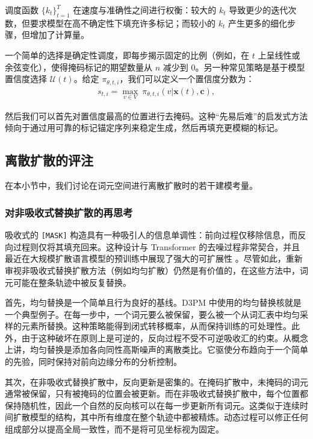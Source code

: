 \documentclass[UTF8,a4paper,zihao=-4,oneside,openany]{ctexbook}
\begin{document}
\noindent 调度函数 $\{k_t\}_{t=1}^T$ 在速度与准确性之间进行权衡：较大的 $k_t$ 导致更少的迭代次数，但要求模型在高不确定性下填充许多标记；而较小的 $k_t$ 产生更多的细化步骤，但增加了计算量。

一个简单的选择是确定性调度，即每步揭示固定的比例（例如，在 $t$ 上呈线性或余弦变化），使得掩码标记的期望数量从 $n$ 减少到 $0$。另一种常见策略是基于模型置信度选择 $\mathcal{U}(t)$。给定 $\pi_{\theta,t,i}$，我们可以定义一个置信度分数为：
\begin{eqnarray}
s_{t,i} = \max_{v\in V}\ \pi_{\theta,t,i}\!\left(v| \mathbf{x}(t),\mathbf{c}\right),
\end{eqnarray}

\noindent 然后我们可以首先对置信度最高的位置进行去掩码。这种“先易后难”的启发式方法倾向于通过用可靠的标记锚定序列来稳定生成，然后再填充更模糊的标记。
\subsection{离散扩散的评注}

在本小节中，我们讨论在词元空间进行离散扩散时的若干建模考量。

\subsubsection{对非吸收式替换扩散的再思考}
\label{sec:rethink-non-absorbing}

吸收式的 \texttt{[MASK]} 构造具有一种吸引人的信息单调性：前向过程仅移除信息，而反向过程则仅将其填充回来。这种设计与 Transformer 的去噪过程非常契合，并且最近在大规模扩散语言模型的预训练中展现了强大的可扩展性 \citep{sahoo-etal:2024simple,nie-etal:2025large}。尽管如此，重新审视非吸收式替换扩散方法（例如均匀扩散）仍然是有价值的，在这些方法中，词元可能在整条轨迹中被反复替换。

首先，均匀替换是一个简单且行为良好的基线。D3PM 中使用的均匀替换核就是一个典型例子。在每一步中，一个词元要么被保留，要么被一个从词汇表中均匀采样的元素所替换。这种策略能得到闭式转移概率，从而保持训练的可处理性。此外，由于这种破坏在原则上是可逆的，反向过程不受不可逆吸收汇的约束。从概念上讲，均匀替换是添加各向同性高斯噪声的离散类比。它驱使分布趋向于一个简单的先验，同时保持对前向边缘分布的分析控制。

其次，在非吸收式替换扩散中，反向更新是密集的。在掩码扩散中，未掩码的词元通常被保留，只有被掩码的位置会被更新。而在非吸收式替换扩散中，每个位置都保持随机性，因此一个自然的反向核可以在每一步更新所有词元。这类似于连续时间扩散模型的结构，其中所有维度在整个轨迹中都被精炼。动态过程可以修正任何组成部分以提高全局一致性，而不是将可见坐标视为固定。
\end{document}
